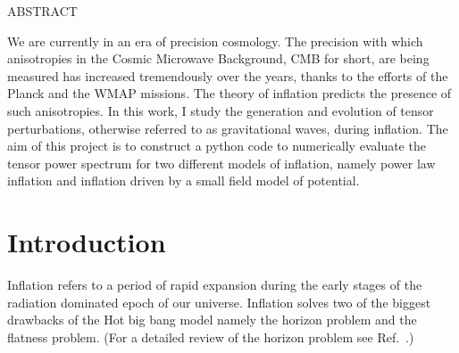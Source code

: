 \documentclass[12pt,a4paper,oneside]{book}
\begin{document}

\newpage\topskip 40pt
\thispagestyle{empty}
\centerline{\Large ABSTRACT}
\vskip 20pt\noindent 

We are currently in an era of precision cosmology. The precision with which anisotropies in the 
Cosmic Microwave Background, CMB for short, are being measured has increased tremendously over 
the years, thanks to the efforts of the Planck and the WMAP missions. The theory of inflation predicts 
the presence of such anisotropies. In this work, I study the generation and evolution of tensor perturbations, 
otherwise referred to as gravitational waves, during inflation. The aim of this project is to construct a 
python code to numerically evaluate the tensor power spectrum for two different models of inflation, 
namely power law inflation and inflation driven by a small field model of potential.


\newpage
\thispagestyle{empty}
\tableofcontents
\newpage


\newpage
\thispagestyle{empty}
\listoffigures
\newpage




\chapter{Introduction}

\noindent Inflation refers to a period of rapid expansion during the early stages of the radiation dominated epoch of our universe. 
Inflation solves two of the biggest drawbacks of the Hot big bang model namely the horizon problem and the flatness problem. (For a 
detailed review of the horizon problem see Ref.~\cite{Sriramkumar L - 2009}.)
\end{document}
